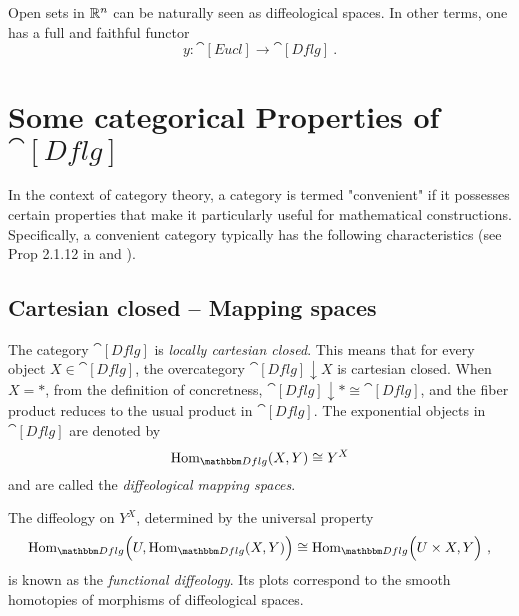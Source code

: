 \documentclass[a4paper,11pt]{article}  %
\newcommand{\Eucl}{\cat[Eucl]}
\newcommand{\Dflg}{\cat[Dflg]}
\begin{document}
\begin{remark}
	Open sets in $\mathbb{R}^n$ can be naturally seen as diffeological spaces.
	In other terms, one has a full and faithful functor\cite[Prop. 2.1.14]{Blohmann24}
	$$ y:\Eucl \to \Dflg~.$$

\end{remark}

\section{Some categorical Properties of $\Dflg$}
%
In the context of category theory, a category is termed "convenient" if it possesses certain properties that make it particularly useful for mathematical constructions.
 Specifically, a convenient category typically has the following characteristics (see Prop 2.1.12 in \cite{Blohmann24} and \cite{Baez2011}).

\subsection{Cartesian closed -- Mapping spaces}
%


The category $\Dflg$ is \emph{locally cartesian closed}. This means that for every object $X \in \Dflg$, the overcategory $\Dflg \downarrow X$ is cartesian closed. 
When $X = *$, from the definition of concretness, \(\Dflg \downarrow * \cong \Dflg\), and the fiber product reduces to the usual product in $\Dflg$. The exponential objects in $\Dflg$ are denoted by 
$$
	\Hom_{\Dflg}(X,Y) \cong Y^X
$$
and are called the \emph{diffeological mapping spaces}.

The diffeology on $Y^X$, determined by the universal property
$$
	\Hom_{\Dflg}\Big(U, \Hom_{\Dflg}(X,Y)\Big) \cong \Hom_{\Dflg}\Big( U\times X, Y\Big)~,
$$
is known as the \emph{functional diffeology}. Its plots correspond to the smooth homotopies of morphisms of diffeological spaces.


\end{document}
